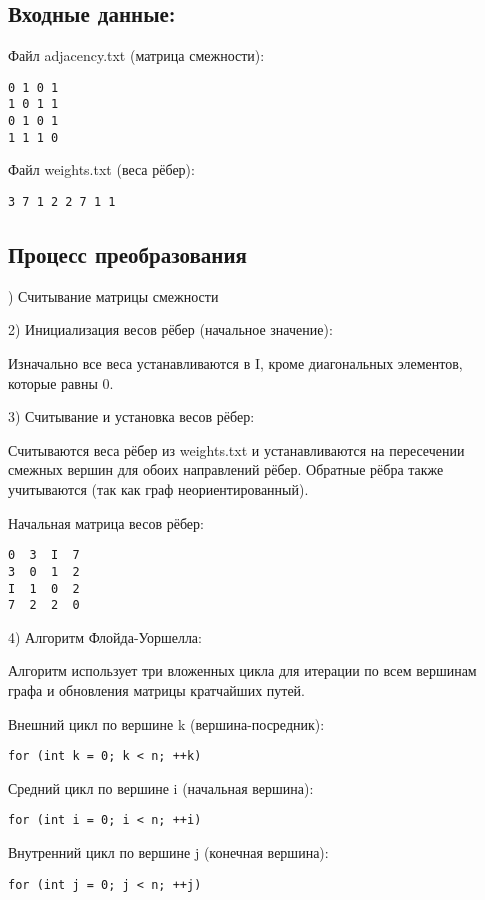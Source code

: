 \documentclass[12pt]{article}
\begin{document}
\subsection{Входные данные:}

Файл adjacency.txt (матрица смежности):
\begin{verbatim}
0 1 0 1 
1 0 1 1 
0 1 0 1 
1 1 1 0
\end{verbatim}

Файл weights.txt (веса рёбер): 
\begin{verbatim}
3 7 1 2 2 7 1 1
\end{verbatim}

\subsection{Процесс преобразования}

) Считывание матрицы смежности

2) Инициализация весов рёбер (начальное значение):

Изначально все веса устанавливаются в I, кроме диагональных элементов, которые равны 0.

3) Считывание и установка весов рёбер:

Считываются веса рёбер из weights.txt и устанавливаются на пересечении смежных вершин для обоих направлений рёбер. Обратные рёбра также учитываются (так как граф неориентированный). 

Начальная матрица весов рёбер:
\begin{verbatim}
0  3  I  7
3  0  1  2
I  1  0  2
7  2  2  0
\end{verbatim}

4) Алгоритм Флойда-Уоршелла:

Алгоритм использует три вложенных цикла для итерации по всем вершинам графа и обновления матрицы кратчайших путей. 

Внешний цикл по вершине k (вершина-посредник):
\begin{verbatim}
for (int k = 0; k < n; ++k)
\end{verbatim}

Средний цикл по вершине i (начальная вершина):
\begin{verbatim}
for (int i = 0; i < n; ++i)
\end{verbatim}

Внутренний цикл по вершине j (конечная вершина):
\begin{verbatim}
for (int j = 0; j < n; ++j)
\end{verbatim}
\end{document}
